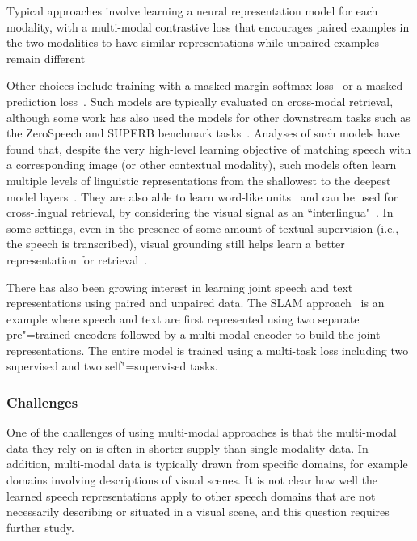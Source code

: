 Typical approaches involve learning a neural representation model for each modality, with a multi-modal contrastive loss that encourages paired examples in the two modalities to have similar representations while unpaired examples remain different~\parencite{synnaeve_learning_2014,harwath_unsupervised_2016,harwath_deep_2015,merkx_language_2019,rouditchenko_avlnet_2021,peng_fastslow_2022}

Other choices include training with a masked margin softmax loss~\parencite{ilharco_largescale_2019,sanabria_talk_2021} or a masked prediction loss~\parencite{chan_multimodal_2022}.  Such models are typically evaluated on cross-modal retrieval, although some work has also used the models for other downstream tasks such as the ZeroSpeech and SUPERB benchmark tasks~\parencite{peng_selfsupervised_2022}. 
Analyses of such models have found that, despite the very high-level learning objective of matching speech with a corresponding image (or other contextual modality), such models often learn multiple levels of linguistic representations from the shallowest to the deepest model layers~\parencite{harwath_learning_2019,chrupala_representations_2017,scharenborg_linguistic_2018}.  They are also able to learn word-like units~\parencite{harwath_jointly_2018,peng_word_2022,wang_dnnhmmdnn_2020} and can be used for cross-lingual retrieval, by considering the visual signal as an ``interlingua"~\parencite{harwath_vision_2018,havard_models_2019,kamper_visually_2018}. 
In some settings, even in the presence of some amount of textual supervision (i.e., the speech is transcribed), visual grounding still helps learn a better representation for retrieval~\parencite{pasad_contributions_2019}. 

There has also been growing interest in learning joint speech and text representations using paired and unpaired data. The SLAM approach~\parencite{bapna_slam_2021} is an example where speech and text are first represented using two separate pre"=trained encoders followed by a multi-modal encoder to build the joint representations. The entire model is trained using a multi-task loss including two supervised and two self"=supervised tasks. 

\subsubsection{Challenges}
One of the challenges of using multi-modal approaches is that the multi-modal data they rely on is often in shorter supply than single-modality data. In addition, multi-modal data is typically drawn from specific domains, for example domains involving descriptions of visual scenes. It is not clear how well the learned speech representations apply to other speech domains that are not necessarily describing or situated in a visual scene, and this question requires further study.

